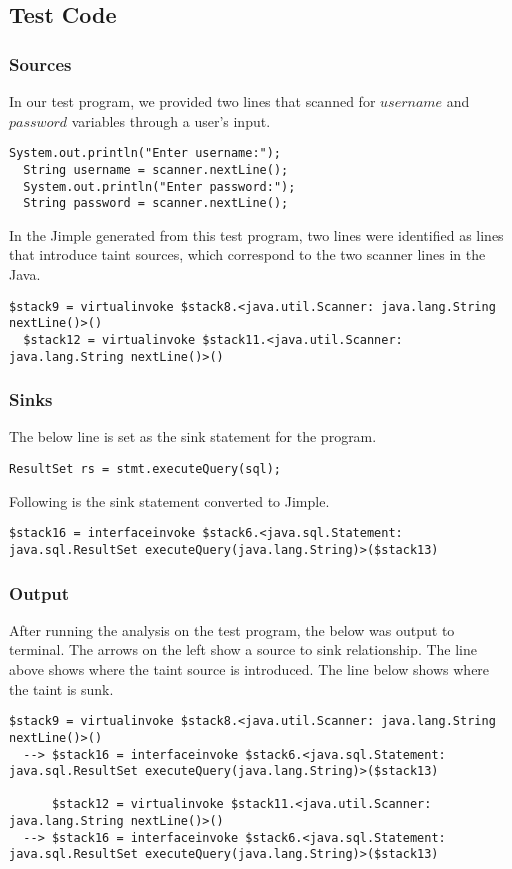 \documentclass[acmsmall]{acmart}
\begin{document}
\subsection{Test Code}
\subsubsection{Sources}
In our test program, we provided two lines that scanned for $username$ and $password$ variables through a user's input.
\begin{lstlisting}[label=lst:sourcesJava,caption=Taint sources in Java.]
  System.out.println("Enter username:");
  String username = scanner.nextLine();
  System.out.println("Enter password:");
  String password = scanner.nextLine();
\end{lstlisting}

In the Jimple generated from this test program, two lines were identified as lines that introduce taint sources, which correspond to the two scanner lines in the Java.
\begin{lstlisting}[label=lst:sources,caption=Taint sources in test Jimple.]
  $stack9 = virtualinvoke $stack8.<java.util.Scanner: java.lang.String nextLine()>()
  $stack12 = virtualinvoke $stack11.<java.util.Scanner: java.lang.String nextLine()>()
\end{lstlisting}
\subsubsection{Sinks}
The below line is set as the sink statement for the program.
\begin{lstlisting}[label=lst:sinksJava,caption=Sinks in Java.]
  ResultSet rs = stmt.executeQuery(sql);
\end{lstlisting}

Following is the sink statement converted to Jimple.
\begin{lstlisting}[label=lst:sources,caption=Sinks in Jimple.]
  $stack16 = interfaceinvoke $stack6.<java.sql.Statement: java.sql.ResultSet executeQuery(java.lang.String)>($stack13)
\end{lstlisting}

\subsubsection{Output}
After running the analysis on the test program, the below was output to terminal. The arrows on the left show a source to sink relationship. The line above shows where the taint source is introduced. The line below shows where the taint is sunk.
\begin{lstlisting}[label=lst:sinks,caption=Source to sink paths.]
      $stack9 = virtualinvoke $stack8.<java.util.Scanner: java.lang.String nextLine()>()
  --> $stack16 = interfaceinvoke $stack6.<java.sql.Statement: java.sql.ResultSet executeQuery(java.lang.String)>($stack13)

      $stack12 = virtualinvoke $stack11.<java.util.Scanner: java.lang.String nextLine()>()
  --> $stack16 = interfaceinvoke $stack6.<java.sql.Statement: java.sql.ResultSet executeQuery(java.lang.String)>($stack13)
\end{lstlisting}
\end{document}
